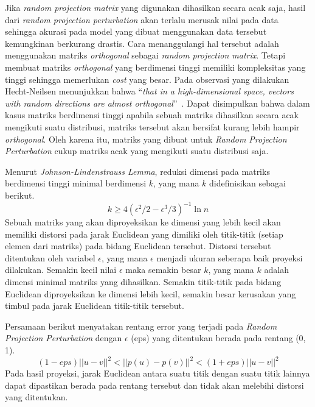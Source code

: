 Jika \textit{random projection matrix} yang digunakan dihasilkan secara acak saja, hasil dari \textit{random projection perturbation} akan terlalu merusak nilai pada data sehingga akurasi pada model yang dibuat menggunakan data tersebut kemungkinan berkurang drastis. Cara menanggulangi hal tersebut adalah menggunakan matriks \textit{orthogonal} sebagai \textit{random projection matrix}. Tetapi membuat matriks \textit{orthogonal} yang berdimensi tinggi memiliki kompleksitas yang tinggi sehingga memerlukan \textit{cost} yang besar. Pada observasi yang dilakukan Hecht-Neilsen menunjukkan bahwa “\textit{that in a high-dimensional space, vectors with random directions are almost orthogonal}”~\cite{bingham:01:projection}. Dapat disimpulkan bahwa dalam kasus matriks berdimensi tinggi apabila sebuah matriks dihasilkan secara acak mengikuti suatu distribusi, matriks tersebut akan bersifat kurang lebih hampir \textit{orthogonal}. Oleh karena itu, matriks yang dibuat untuk \textit{Random Projection Perturbation} cukup matriks acak yang mengikuti suatu distribusi saja.

Menurut \textit{Johnson-Lindenstrauss Lemma}, reduksi dimensi pada matriks berdimensi tinggi minimal berdimensi \(k\), yang mana \(k\) didefinisikan sebagai berikut.
\begin{equation}
	k \geq 4(\epsilon^{2}/2-\epsilon^{3}/3)^{-1}\ln{n}
\end{equation}
Sebuah matriks yang akan diproyeksikan ke dimensi yang lebih kecil akan memiliki distorsi pada jarak Euclidean yang dimiliki oleh titik-titik (setiap elemen dari matriks) pada bidang Euclidean tersebut. Distorsi tersebut ditentukan oleh variabel \(\epsilon\), yang mana \(\epsilon\) menjadi ukuran seberapa baik proyeksi dilakukan. Semakin kecil nilai \(\epsilon\) maka semakin besar \(k\), yang mana \(k\) adalah dimensi minimal matriks yang dihasilkan. Semakin titik-titik pada bidang Euclidean diproyeksikan ke dimensi lebih kecil, semakin besar kerusakan yang timbul pada jarak Euclidean titik-titik tersebut.

Persamaan berikut menyatakan rentang error yang terjadi pada \textit{Random Projection Perturbation} dengan \(\epsilon\) (eps) yang ditentukan berada pada rentang (0, 1). 
\begin{equation}
	(1-eps)||u - v||^{2}<||p(u) - p(v)||^{2}<(1+eps)||u - v||^{2}
\end{equation}
Pada hasil proyeksi, jarak Euclidean antara suatu titik dengan suatu titik lainnya dapat dipastikan berada pada rentang tersebut dan tidak akan melebihi distorsi yang ditentukan.

